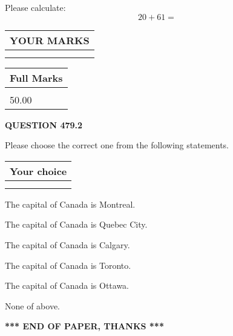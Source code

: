 \documentclass[12pt]{article}
\begin{document}
  
 
Please calculate:
\begin{equation}
20 +  %
61 = \nonumber
\end{equation}
 

 

 
  
\vspace{0.2in}
  
\noindent\begin{tabular}{|l|}
\hline
 YOUR MARKS  \\
\hline
 \\ 
 \\ 
\hline
\end{tabular}
\hspace{0.05in} \begin{tabular}{|l|}
\hline
 Full Marks  \\
\hline
 \\ 
50.00 \\
\hline
\end{tabular}
{\textbf{\Large{QUESTION
479.2 
}}}
  
  
Please choose the correct one from the following statements.
  
  
\noindent\hspace{3.0in} \begin{tabular}{|l|}
\hline
Your choice \\
\hline
 \\ 
 \\ 
\hline
\end{tabular}
  
  
 
 
The capital of Canada is Montreal.
 
 
The capital of Canada is Quebec City.
 
 
The capital of Canada is Calgary.
 
 
The capital of Canada is Toronto.
 
 
The capital of Canada is Ottawa.
 
 
 None of above.
 
 
   
   
 \vspace{0.2in}
 
   
   
   
   
\vspace{1.0in} 
{\textbf{\large{ *** END OF PAPER, THANKS *** }}} 
   
\end{document}
